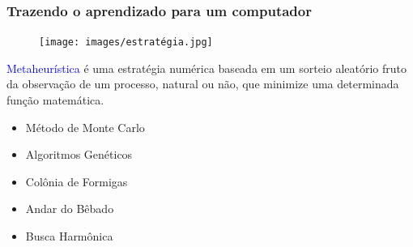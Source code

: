 \documentclass[aspectratio=169]{beamer} %
\begin{document}
\begin{frame}
	\frametitle{Trazendo o aprendizado para um computador}
	\begin{figure}
		\centering
		\texttt{[image: images/estratégia.jpg]} %
	\end{figure}	

	\pause

	\begin{minipage}{0.5\textwidth}
		\begin{tcolorbox}[colback=gray!5,colframe=blue!40!black,title=Estratégia 1]
			\justifying
			\textcolor{blue}{Metaheurística} é uma estratégia numérica baseada em um sorteio aleatório fruto da observação de um processo, natural ou não, que minimize uma determinada função matemática.  
		\end{tcolorbox}
    \end{minipage}%
		\pause
    \begin{minipage}{0.5\textwidth}
        \begin{itemize}
	     \item Método de Monte Carlo
	     \item Algoritmos Genéticos
	     \item Colônia de Formigas
	     \item Andar do Bêbado
	     \item Busca Harmônica
	    \end{itemize}
	\end{minipage}

\end{frame}
\end{document}
